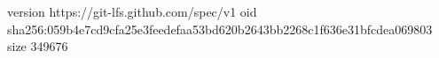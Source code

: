 version https://git-lfs.github.com/spec/v1
oid sha256:059b4e7cd9cfa25e3feedefaa53bd620b2643bb2268c1f636e31bfcdea069803
size 349676
